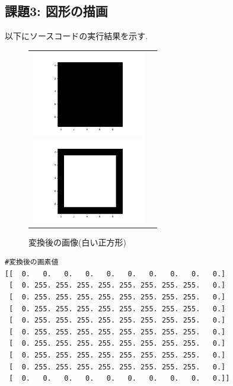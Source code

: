 \documentclass[a4paper,11pt,uplatex, titlepage]{jsarticle}
\begin{document}
\subsection{課題3: 図形の描画}
以下にソースコードの実行結果を示す.

\begin{figure}[H]
  \begin{tabular}{cc}
    \begin{minipage}{0.5\hsize}
      \begin{center}
        \includegraphics[width = 5cm]{pic/kadai_1.png}
        \caption{変換前の画像}
        \label{black2}
      \end{center}
    \end{minipage}

    \begin{minipage}{0.5\hsize}
      \begin{center}
        \includegraphics[width = 5cm]{pic/kadai3_success.png}
        \caption{変換後の画像(白い正方形)}
        \label{white_square}
      \end{center}
    \end{minipage}
  \end{tabular}
\end{figure}

\begin{lstlisting}[basicstyle=\ttfamily\footnotesize]
#変換後の画素値
[[  0.   0.   0.   0.   0.   0.   0.   0.   0.   0.]
 [  0. 255. 255. 255. 255. 255. 255. 255. 255.   0.]
 [  0. 255. 255. 255. 255. 255. 255. 255. 255.   0.]
 [  0. 255. 255. 255. 255. 255. 255. 255. 255.   0.]
 [  0. 255. 255. 255. 255. 255. 255. 255. 255.   0.]
 [  0. 255. 255. 255. 255. 255. 255. 255. 255.   0.]
 [  0. 255. 255. 255. 255. 255. 255. 255. 255.   0.]
 [  0. 255. 255. 255. 255. 255. 255. 255. 255.   0.]
 [  0. 255. 255. 255. 255. 255. 255. 255. 255.   0.]
 [  0.   0.   0.   0.   0.   0.   0.   0.   0.   0.]]
\end{lstlisting}
\end{document}
